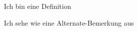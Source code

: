 \documentclass[tikz,preview]{article}
\begin{document}
    \begin{preview}
        \begin{definition}
            Ich bin eine Definition
        \end{definition}
    
        \begin{bemerkung}
            Ich sehe wie eine Alternate-Bemerkung aus
        \end{bemerkung}
    \end{preview}
\end{document}
